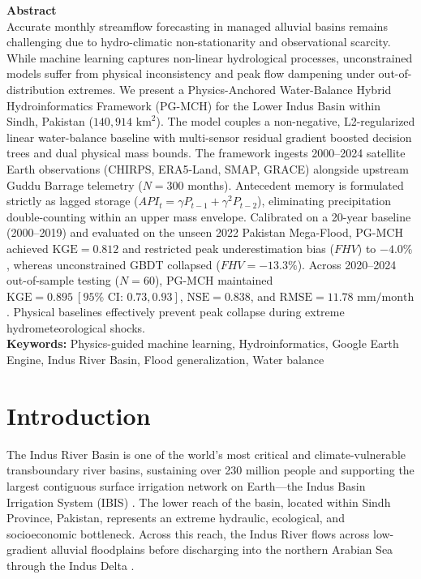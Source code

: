 \documentclass[11pt,a4paper,fleqn]{article}
\begin{document}
\begin{singlespace}
\noindent \textbf{Abstract}\\
Accurate monthly streamflow forecasting in managed alluvial basins remains challenging due to hydro-climatic non-stationarity and observational scarcity. While machine learning captures non-linear hydrological processes, unconstrained models suffer from physical inconsistency and peak flow dampening under out-of-distribution extremes. We present a Physics-Anchored Water-Balance Hybrid Hydroinformatics Framework (PG-MCH) for the Lower Indus Basin within Sindh, Pakistan ($140,914\text{ km}^2$). The model couples a non-negative, L2-regularized linear water-balance baseline with multi-sensor residual gradient boosted decision trees and dual physical mass bounds. The framework ingests 2000--2024 satellite Earth observations (CHIRPS, ERA5-Land, SMAP, GRACE) alongside upstream Guddu Barrage telemetry ($N = 300$ months). Antecedent memory is formulated strictly as lagged storage ($API_t = \gamma P_{t-1} + \gamma^2 P_{t-2}$), eliminating precipitation double-counting within an upper mass envelope. Calibrated on a 20-year baseline (2000--2019) and evaluated on the unseen 2022 Pakistan Mega-Flood, PG-MCH achieved $\text{KGE} = 0.812$ and restricted peak underestimation bias ($FHV$) to $-4.0\%$, whereas unconstrained GBDT collapsed ($FHV = -13.3\%$). Across 2020--2024 out-of-sample testing ($N = 60$), PG-MCH maintained $\text{KGE} = 0.895\ [95\%\text{ CI: } 0.73, 0.93]$, $\text{NSE} = 0.838$, and $\text{RMSE} = 11.78\text{ mm/month}$. Physical baselines effectively prevent peak collapse during extreme hydrometeorological shocks.\\[1.2em]

\noindent \textbf{Keywords:} Physics-guided machine learning, Hydroinformatics, Google Earth Engine, Indus River Basin, Flood generalization, Water balance\\[1.5em]

\end{singlespace}

\newpage


\section{Introduction}
The Indus River Basin is one of the world's most critical and climate-vulnerable transboundary river basins, sustaining over 230 million people and supporting the largest contiguous surface irrigation network on Earth---the Indus Basin Irrigation System (IBIS) \citep{immerzeel2020importance, young2019pakistan}. The lower reach of the basin, located within Sindh Province, Pakistan, represents an extreme hydraulic, ecological, and socioeconomic bottleneck. Across this reach, the Indus River flows across low-gradient alluvial floodplains before discharging into the northern Arabian Sea through the Indus Delta \citep{hashmi2022hydrodynamic, inam2007geographic}.
\end{document}
